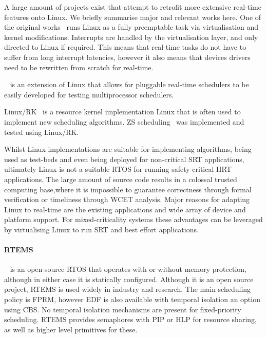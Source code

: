 A large amount of projects exist that attempt to retrofit more extensive real-time features onto
Linux.  We briefly summarise major and relevant works here.  One of the original
works~\citep{Yodaiken_Barabanov_97} runs Linux as a fully preemptable task via virtualisation and
kernel modifications.  Interrupts are handled by the virtualisation layer, and only directed to
Linux if required.  This means that real-time tasks do not have to suffer from long interrupt
latencies, however it also means that devices drivers need to be rewritten from scratch for
real-time.

\litmus~\citep{Calandrino_LBDA_07} is an extension of Linux that allows for pluggable real-time
schedulers to be easily developed for testing multiprocessor schedulers.

Linux/RK~\citep{Oikawa_Rajkumar_98} is a resource kernel implementation Linux that is often used to
implement new scheduling algorithms.  \gls{ZS} scheduling~\citep{deNiz_LR_09} was implemented and
tested using Linux/RK.

Whilst Linux implementations are suitable for implementing algorithms, being used as test-beds and
even being deployed for non-critical \gls{SRT} applications, ultimately Linux is not a suitable
\gls{RTOS} for running safety-critical \gls{HRT} applications. The large amount of source code
results in a colossal trusted computing base,where it is impossible to guarantee correctness through
formal verification or timeliness through {\gls{WCET}} analysis.  Major reasons for adapting Linux
to real-time are the existing applications and wide array of device and platform support. For
mixed-criticality systems these advantages can be leveraged by virtualising Linux to run \gls{SRT}
and best effort applications.

\paragraph{RTEMS}~\citep{RTEMS:URL} is an open-source \gls{RTOS} that operates with or without
memory protection, although in either case it is statically configured.  Although it is an open
source project, RTEMS is used widely in industry and research.  The main scheduling policy is
\gls{FPRM}, however \gls{EDF} is also available with temporal isolation an option using \gls{CBS}.
No temporal isolation mechanisms are present for fixed-priority scheduling.  RTEMS provides
semaphores with \gls{PIP} or \gls{HLP} for resource sharing, as well as
higher level primitives for these. 

